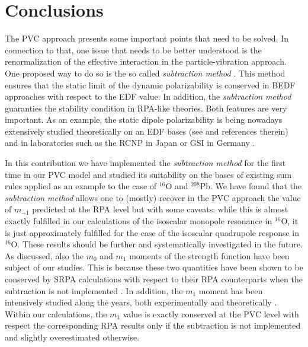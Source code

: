 \documentclass[12pt,a4paper,final]{iopart}
\newcommand{\red}[1]{\textcolor[rgb]{1.0,0.0,0.0}{#1}}
\begin{document}
\section{Conclusions}
\label{conclusions}

The PVC approach presents some important points that need to be solved. In connection to that, one issue that needs to be better understood is the renormalization of the effective interaction in the particle-vibration approach. One proposed way to do so is the so called {\it subtraction method} \cite{tselyaev2013}. This method ensures that the static limit of the dynamic polarizability is conserved in BEDF approaches with respect to the EDF value. 
In addition, the {\it subtraction method} guaranties the stability condition in RPA-like theories. Both features are very important. As an example, the static dipole polarizability is being nowadays extensively studied theoretically on an EDF bases (see \cite{roca-maza2015} and references therein) and in laboratories such as the RCNP in Japan or GSI in Germany \cite{tamii2011,rossi2013,hashimoto2015}. 

In this contribution we have implemented the {\it subtraction method} for the first time in our PVC model and studied its suitability on the bases of existing sum rules applied as an example to the case of ${}^{16}$O and ${}^{208}$Pb. We have found that the {\it subtraction method} allows one to (mostly) recover in the PVC approach the value of $m_{-1}$ predicted at the RPA level but with some caveats: while this is almost exactly fulfilled in our calculations of the isoscalar monopole resonance in ${}^{16}$O, it is just approximately fulfilled for the case of the isoscalar quadrupole response in ${}^{16}$O. These results should be further and systematically investigated in the future. As discussed, also the $m_0$ and $m_1$ moments of the strength function have been subject of our studies. This is because these two quantities have been shown to be conserved by SRPA calculations with respect to their RPA counterparts when the subtraction is not implemented \cite{yannouleas1987, wambach1990}. In addition, the $m_1$ moment has been intensively studied along the years, both experimentally and theoretically \cite{bortignonbook, harakeh2001}. Within our calculations, the $m_1$ value is exactly conserved at the PVC level with respect the corresponding RPA results only if the subtraction is not implemented and slightly overestimated otherwise. %
\end{document}
